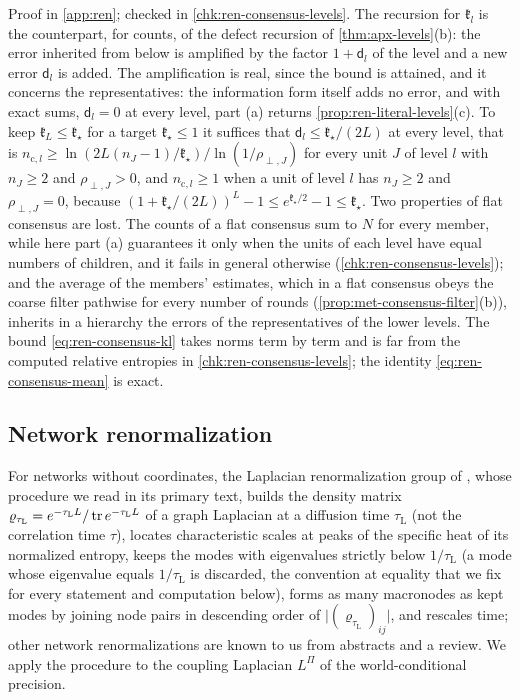 Proof in \cref{app:ren}; checked in \cref{chk:ren-consensus-levels}. The recursion for $\mathfrak k_l$ is the counterpart, for counts, of the defect recursion of \cref{thm:apx-levels}(b): the error inherited from below is amplified by the factor $1+\mathsf d_l$ of the level and a new error $\mathsf d_l$ is added. The amplification is real, since the bound is attained, and it concerns the representatives: the information form itself adds no error, and with exact sums, $\mathsf d_l=0$ at every level, part (a) returns \cref{prop:ren-literal-levels}(c). To keep $\mathfrak k_L\le\mathfrak k_\star$ for a target $\mathfrak k_\star\le1$ it suffices that $\mathsf d_l\le\mathfrak k_\star/(2L)$ at every level, that is $n_{\mathrm c,l}\ge\ln(2L(n_J-1)/\mathfrak k_\star)/\ln(1/\rho_{\perp,J})$ for every unit $J$ of level $l$ with $n_J\ge2$ and $\rho_{\perp,J}>0$, and $n_{\mathrm c,l}\ge1$ when a unit of level $l$ has $n_J\ge2$ and $\rho_{\perp,J}=0$, because $(1+\mathfrak k_\star/(2L))^L-1\le e^{\mathfrak k_\star/2}-1\le\mathfrak k_\star$. Two properties of flat consensus are lost. The counts of a flat consensus sum to $N$ for every member, while here part (a) guarantees it only when the units of each level have equal numbers of children, and it fails in general otherwise (\cref{chk:ren-consensus-levels}); and the average of the members' estimates, which in a flat consensus obeys the coarse filter pathwise for every number of rounds (\cref{prop:met-consensus-filter}(b)), inherits in a hierarchy the errors of the representatives of the lower levels. The bound \eqref{eq:ren-consensus-kl} takes norms term by term and is far from the computed relative entropies in \cref{chk:ren-consensus-levels}; the identity \eqref{eq:ren-consensus-mean} is exact.

\subsection{Network renormalization}\label{sec:ren-network}

For networks without coordinates, the Laplacian renormalization group of \citet{villegas2023laplacian}, whose procedure we read in its primary text, builds the density matrix $\varrho_{\tau_{\mathrm L}}=e^{-\tau_{\mathrm L}L}/\operatorname{tr} e^{-\tau_{\mathrm L}L}$ of a graph Laplacian at a diffusion time $\tau_{\mathrm L}$ (not the correlation time $\tau$), locates characteristic scales at peaks of the specific heat of its normalized entropy, keeps the modes with eigenvalues strictly below $1/\tau_{\mathrm L}$ (a mode whose eigenvalue equals $1/\tau_{\mathrm L}$ is discarded, the convention at equality that we fix for every statement and computation below), forms as many macronodes as kept modes by joining node pairs in descending order of $\lvert(\varrho_{\tau_{\mathrm L}})_{ij}\rvert$, and rescales time; other network renormalizations \citep{garciaperez2018multiscale,garuccio2023multiscale,gabrielli2025network} are known to us from abstracts and a review. We apply the procedure to the coupling Laplacian $L^\Pi$ of the world-conditional precision.

